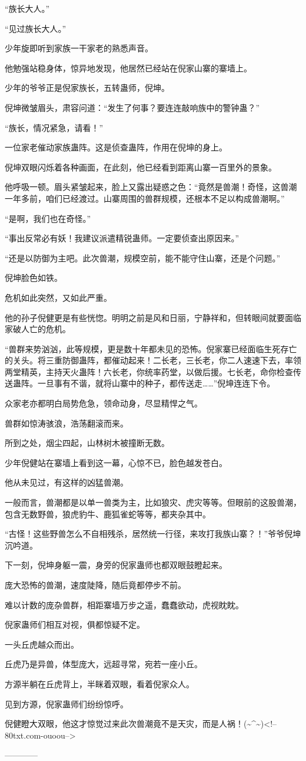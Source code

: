 \begin{this_body}
“族长大人。”

“见过族长大人。”

少年旋即听到家族一干家老的熟悉声音。

他勉强站稳身体，惊异地发现，他居然已经站在倪家山寨的寨墙上。

少年的爷爷正是倪家族长，五转蛊师，倪坤。

倪坤微皱眉头，肃容问道：“发生了何事？要连连敲响族中的警钟蛊？”

“族长，情况紧急，请看！”

一位家老催动家族蛊阵。这是侦查蛊阵，作用在倪坤的身上。

倪坤双眼闪烁着各种画面，在此刻，他已经看到距离山寨一百里外的景象。

他呼吸一顿。眉头紧皱起来，脸上又露出疑惑之色：“竟然是兽潮！奇怪，这兽潮一年多前，咱们已经渡过。山寨周围的兽群规模，还根本不足以构成兽潮啊。”

“是啊，我们也在奇怪。”

“事出反常必有妖！我建议派遣精锐蛊师。一定要侦查出原因来。”

“还是以防御为主吧。此次兽潮，规模空前，能不能守住山寨，还是个问题。”

倪坤脸色如铁。

危机如此突然，又如此严重。

他的孙子倪健更是有些恍惚。明明之前是风和日丽，宁静祥和，但转眼间就要面临家破人亡的危机。

“兽群来势汹汹，此等规模，更是数十年都未见的恐怖。倪家寨已经面临生死存亡的关头。将三重防御蛊阵，都催动起来！二长老，三长老，你二人速速下去，率领两堂精英，主持天火蛊阵！六长老，你统率药堂，以做后援。七长老，命你检查传送蛊阵。一旦事有不谐，就将山寨中的种子，都传送走……”倪坤连连下令。

众家老亦都明白局势危急，领命动身，尽显精悍之气。

兽群如惊涛骇浪，浩荡翻滚而来。

所到之处，烟尘四起，山林树木被撞断无数。

少年倪健站在寨墙上看到这一幕，心惊不已，脸色越发苍白。

他从未见过，有这样的凶猛兽潮。

一般而言，兽潮都是以单一兽类为主，比如狼灾、虎灾等等。但眼前的这股兽潮，包含无数野兽，狼虎豹牛、鹿狐雀蛇等等，都夹杂其中。

“古怪！这些野兽怎么不自相残杀，居然统一行径，来攻打我族山寨？！”爷爷倪坤沉吟道。

下一刻，倪坤身躯一震，身旁的倪家蛊师也都双眼鼓瞪起来。

庞大恐怖的兽潮，速度陡降，随后竟都停步不前。

难以计数的庞杂兽群，相距寨墙万步之遥，蠢蠢欲动，虎视眈眈。

倪家蛊师们相互对视，俱都惊疑不定。

一头丘虎越众而出。

丘虎乃是异兽，体型庞大，远超寻常，宛若一座小丘。

方源半躺在丘虎背上，半眯着双眼，看着倪家众人。

见到方源，倪家蛊师们纷纷惊呼。

倪健瞪大双眼，他这才惊觉过来此次兽潮竟不是天灾，而是人祸！(\~{}\^{}\~{})<!--80txt.com-ouoou-->

------------

\end{this_body}

